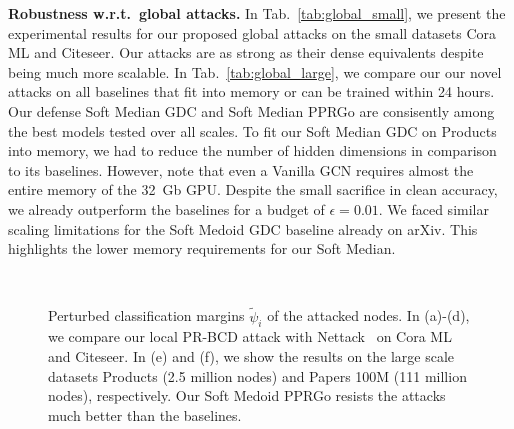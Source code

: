 \documentclass[sigconf, review]{acmart}
\begin{document}

\textbf{Robustness w.r.t.\ global attacks.} In Tab.~\ref{tab:global_small}, we present the experimental results for our proposed global attacks on the small datasets Cora ML and Citeseer. Our attacks are as strong as their dense equivalents despite being much more scalable. In Tab.~\ref{tab:global_large}, we compare our our novel attacks on all baselines that fit into memory or can be trained within 24 hours. Our defense Soft Median GDC and Soft Median PPRGo are consisently among the best models tested over all scales. To fit our Soft Median GDC on Products into memory, we had to reduce the number of hidden dimensions in comparison to its baselines. However, note that even a Vanilla GCN requires almost the entire memory of the 32~Gb GPU. Despite the small sacrifice in clean accuracy, we already outperform the baselines for a budget of \(\epsilon=0.01\). We faced similar scaling limitations for the Soft Medoid GDC baseline already on arXiv. This highlights the lower memory requirements for our Soft Median.


\begin{figure}[t]
  \centering
  \hbox{\hspace{0pt} \resizebox{\linewidth}{!}{}}
  \vspace{-14pt}
  \caption{Perturbed classification margins \(\tilde{\psi}_i\) of the attacked nodes. In (a)-(d), we compare our local PR-BCD attack with Nettack~\cite{Zugner2018} on Cora ML and Citeseer. In (e) and (f), we show the results on the large scale datasets Products (2.5 million nodes) and Papers 100M (111 million nodes), respectively. Our Soft Medoid PPRGo resists the attacks much better than the baselines. \label{fig:emplocal}}
\end{figure}
\end{document}
